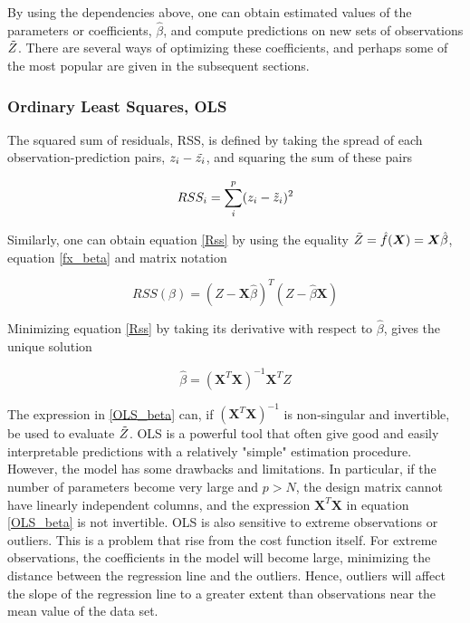 \documentclass[...,numrefs]{wiley-article}
\begin{document}
By using the dependencies above, one can obtain estimated values of the parameters or coefficients, $\hat{\beta}$, and compute predictions on new sets of observations $\Tilde{Z}$. There are several ways of optimizing these coefficients, and perhaps some of the most popular are given in the subsequent sections.


\subsubsection{Ordinary Least Squares, OLS}

The squared sum of residuals, RSS, is defined by taking the spread of each observation-prediction pairs, $z_i-\Tilde{z_i}$, and squaring the sum of these pairs

\begin{equation}
    RSS_i = \sum_{i}^{p}(z_i - \Tilde{z}_{i})^{2}
\end{equation}

Similarly, one can obtain equation \ref{Rss} by using the equality $\Tilde{Z}=\hat{f}(\boldsymbol{X}) = \boldsymbol{X}\hat{\beta}$, equation \ref{fx_beta} and matrix notation

\begin{equation}
    RSS(\beta) = 
     (Z-\boldsymbol{X}\hat{\beta})^T(Z-\hat{\beta}\boldsymbol{X})
     \label{Rss}
\end{equation}
 
Minimizing equation \ref{Rss} by taking its derivative with respect to $\hat{\beta}$, gives the unique solution 

\begin{equation}
    \hat{\beta} = (\boldsymbol{X}^{T}\boldsymbol{X})^{-1}\boldsymbol{X}^{T}Z
    \label{OLS_beta}
\end{equation}

The expression in \ref{OLS_beta} can, if $(\boldsymbol{X}^{T}\boldsymbol{X})^{-1}$ is non-singular and invertible, be used to evaluate $\Tilde{Z}$. 
\newline
\newline
\noindent OLS is a powerful tool that often give good and easily interpretable predictions with a relatively "simple" estimation procedure. However, the model has some drawbacks and limitations. In particular, if the number of parameters become very large and $p>N$, the design matrix cannot have linearly independent columns, and the expression $\boldsymbol{X}^{T}\boldsymbol{X}$ in equation \ref{OLS_beta} is not invertible. OLS is also sensitive to extreme observations or outliers. This is a problem that rise from the cost function itself. For extreme observations, the coefficients in the model will become large, minimizing the distance between the regression line and the outliers. Hence, outliers will affect the slope of the regression line to a greater extent than observations near the mean value of the data set. 
\newline
\end{document}
